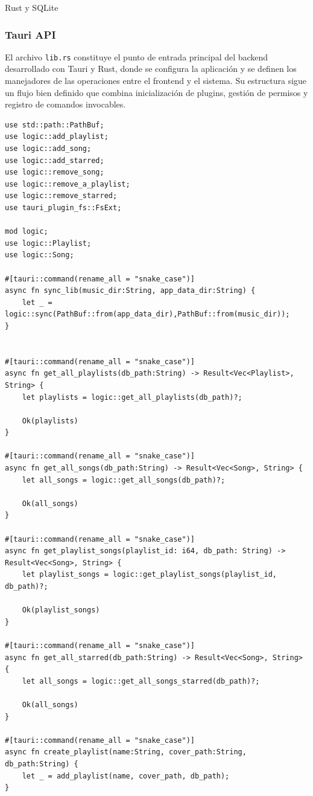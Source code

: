 \documentclass[11pt, a4paper]{article}
\begin{document}
        Rust y SQLite

            \subsubsection{Tauri API}

            El archivo \texttt{lib.rs} constituye el punto de entrada principal del backend desarrollado con Tauri y Rust, donde se configura la aplicación y se definen los manejadores de las operaciones entre el frontend y el sistema. Su estructura sigue un flujo bien definido que combina inicialización de plugins, gestión de permisos y registro de comandos invocables. \\

            \begin{lstlisting}[caption={lib.rs}]
use std::path::PathBuf;
use logic::add_playlist;
use logic::add_song;
use logic::add_starred;
use logic::remove_song;
use logic::remove_a_playlist;
use logic::remove_starred;
use tauri_plugin_fs::FsExt;

mod logic;
use logic::Playlist;
use logic::Song;

#[tauri::command(rename_all = "snake_case")]
async fn sync_lib(music_dir:String, app_data_dir:String) {
    let _ = logic::sync(PathBuf::from(app_data_dir),PathBuf::from(music_dir));
}


#[tauri::command(rename_all = "snake_case")]
async fn get_all_playlists(db_path:String) -> Result<Vec<Playlist>, String> {
    let playlists = logic::get_all_playlists(db_path)?;

    Ok(playlists)
}

#[tauri::command(rename_all = "snake_case")]
async fn get_all_songs(db_path:String) -> Result<Vec<Song>, String> {
    let all_songs = logic::get_all_songs(db_path)?;

    Ok(all_songs)
}

#[tauri::command(rename_all = "snake_case")]
async fn get_playlist_songs(playlist_id: i64, db_path: String) -> Result<Vec<Song>, String> {
    let playlist_songs = logic::get_playlist_songs(playlist_id, db_path)?;

    Ok(playlist_songs)
}

#[tauri::command(rename_all = "snake_case")]
async fn get_all_starred(db_path:String) -> Result<Vec<Song>, String> {
    let all_songs = logic::get_all_songs_starred(db_path)?;

    Ok(all_songs)
}

#[tauri::command(rename_all = "snake_case")]
async fn create_playlist(name:String, cover_path:String, db_path:String) {
    let _ = add_playlist(name, cover_path, db_path);
}


\end{lstlisting}
\end{document}
